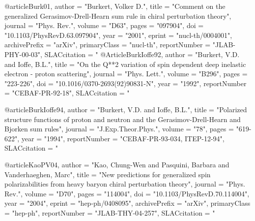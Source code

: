@article{Burk01,
      author         = "Burkert, Volker D.",
      title          = "{Comment on the generalized Gerasimov-Drell-Hearn sum rule in chiral perturbation theory}",
      journal        = "Phys. Rev.",
      volume         = "D63",
      pages          = "097904",
      doi            = "10.1103/PhysRevD.63.097904",
      year           = "2001",
      eprint         = "nucl-th/0004001",
      archivePrefix  = "arXiv",
      primaryClass   = "nucl-th",
      reportNumber   = "JLAB-PHY-00-03",
      SLACcitation   = "%
}
@Article{BurkIoffe92,
      author         = "Burkert, V.D. and Ioffe, B.L.",
      title          = "{On the Q**2 variation of spin dependent deep inelastic electron - proton scattering}",
      journal        = "Phys. Lett.",
      volume         = "B296",
      pages          = "223-226",
      doi            = "10.1016/0370-2693(92)90831-N",
      year           = "1992",
      reportNumber   = "CEBAF-PR-92-18",
      SLACcitation   = "%
}

@article{BurkIoffe94,
      author         = "Burkert, V.D. and Ioffe, B.L.",
      title          = "{Polarized structure functions of proton and neutron and
                        the Gerasimov-Drell-Hearn and Bjorken sum rules}",
      journal        = "J.Exp.Theor.Phys.",
      volume         = "78",
      pages          = "619-622",
      year           = "1994",
      reportNumber   = "CEBAF-PR-93-034, ITEP-12-94",
      SLACcitation   = "%
}

@article{KaoPV04,
      author         = "Kao, Chung-Wen and Pasquini, Barbara and Vanderhaeghen, Marc",
      title          = "{New predictions for generalized spin polarizabilities from heavy baryon chiral perturbation theory}",
      journal        = "Phys. Rev.",
      volume         = "D70",
      pages          = "114004",
      doi            = "10.1103/PhysRevD.70.114004",
      year           = "2004",
      eprint         = "hep-ph/0408095",
      archivePrefix  = "arXiv",
      primaryClass   = "hep-ph",
      reportNumber   = "JLAB-THY-04-257",
      SLACcitation   = "%
}

